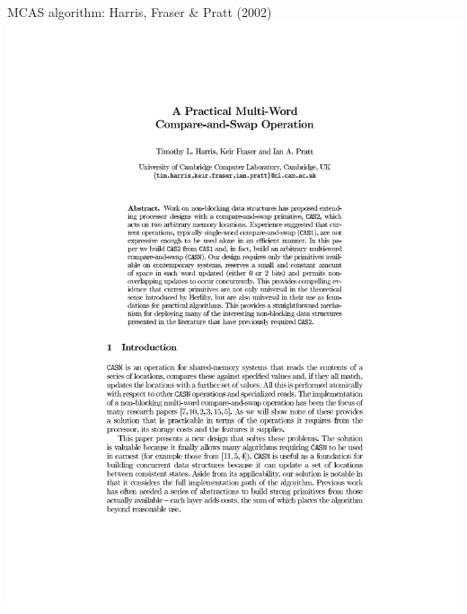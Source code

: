\begin{frame}{MCAS algorithm: Harris, Fraser \& Pratt (2002)}
\centering
\includegraphics[scale=0.5]{images/harris_fraser_pratt_2002.pdf}
\end{frame}

